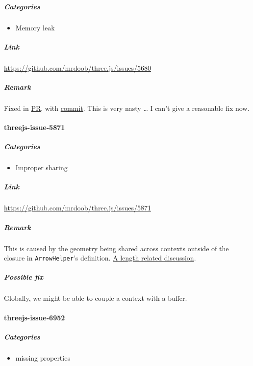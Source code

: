 \documentclass[]{article}
\begin{document}
\subparagraph{Categories}\label{categories-10}

\begin{itemize}
\itemsep1pt\parskip0pt
\item
  Memory leak
\end{itemize}

\subparagraph{Link}\label{link-10}

\url{https://github.com/mrdoob/three.js/issues/5680}

\subparagraph{Remark}\label{remark-10}

Fixed in \href{https://github.com/mrdoob/three.js/pull/5723}{PR}, with
\href{https://github.com/AVGP/three.js/commit/2518eaac07154bd466c4a7d18b819cc47f5ee0aa}{commit}.
This is very nasty \ldots{} I can't give a reasonable fix now.

\paragraph{threejs-issue-5871}\label{threejs-issue-5871}

\subparagraph{Categories}\label{categories-11}

\begin{itemize}
\itemsep1pt\parskip0pt
\item
  Improper sharing
\end{itemize}

\subparagraph{Link}\label{link-11}

\url{https://github.com/mrdoob/three.js/issues/5871}

\subparagraph{Remark}\label{remark-11}

This is caused by the geometry being shared across contexts outside of
the closure in \texttt{ArrowHelper}'s definition.
\href{https://github.com/mrdoob/three.js/pull/6723}{A length related
discussion}.

\subparagraph{Possible fix}\label{possible-fix-9}

Globally, we might be able to couple a context with a buffer.

\paragraph{threejs-issue-6952}\label{threejs-issue-6952}

\subparagraph{Categories}\label{categories-12}

\begin{itemize}
\itemsep1pt\parskip0pt
\item
  missing properties
\end{itemize}
\end{document}
